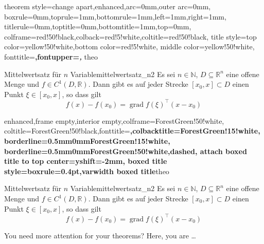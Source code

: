 \begin{dispExample}
%
  {theorem style=change apart,enhanced,arc=0mm,outer arc=0mm,
  boxrule=0mm,toprule=1mm,bottomrule=1mm,left=1mm,right=1mm,
  titlerule=0mm,toptitle=0mm,bottomtitle=1mm,top=0mm,
  colframe=red!50!black,colback=red!5!white,coltitle=red!50!black,
  title style={top color=yellow!50!white,bottom color=red!5!white,
    middle color=yellow!50!white},
  fonttitle=\bfseries\sffamily\normalsize,fontupper=\normalsize\itshape,
  }{theo}

\begin{YetAnotherTheorem}{Mittelwertsatz f\"{u}r $n$ Variable}{mittelwertsatz_n2}%
  Es sei $n\in\mathbb{N}$, $D\subseteq\mathbb{R}^n$ eine offene Menge und
  $f\in C^{1}(D,\mathbb{R})$. Dann gibt es auf jeder Strecke
  $[x_0,x]\subset D$ einen Punkt $\xi\in[x_0,x]$, so dass gilt
  \begin{equation*}
  f(x)-f(x_0) = \operatorname{grad} f(\xi)^{\top}(x-x_0)
  \end{equation*}
\end{YetAnotherTheorem}
\end{dispExample}


\begin{dispExample}
%
{enhanced,frame empty,interior empty,colframe=ForestGreen!50!white,
  coltitle=ForestGreen!50!black,fonttitle=\bfseries,colbacktitle=ForestGreen!15!white,
  borderline={0.5mm}{0mm}{ForestGreen!15!white},
  borderline={0.5mm}{0mm}{ForestGreen!50!white,dashed},
  attach boxed title to top center={yshift=-2mm},
  boxed title style={boxrule=0.4pt},varwidth boxed title}{theo}

\begin{YetAnotherTheorem}{Mittelwertsatz f\"{u}r $n$ Variable}{mittelwertsatz_n2}%
  Es sei $n\in\mathbb{N}$, $D\subseteq\mathbb{R}^n$ eine offene Menge und
  $f\in C^{1}(D,\mathbb{R})$. Dann gibt es auf jeder Strecke
  $[x_0,x]\subset D$ einen Punkt $\xi\in[x_0,x]$, so dass gilt
  \begin{equation*}
  f(x)-f(x_0) = \operatorname{grad} f(\xi)^{\top}(x-x_0)
  \end{equation*}
\end{YetAnotherTheorem}
\end{dispExample}


\clearpage
You need more attention for your theorems? Here, you are \ldots

